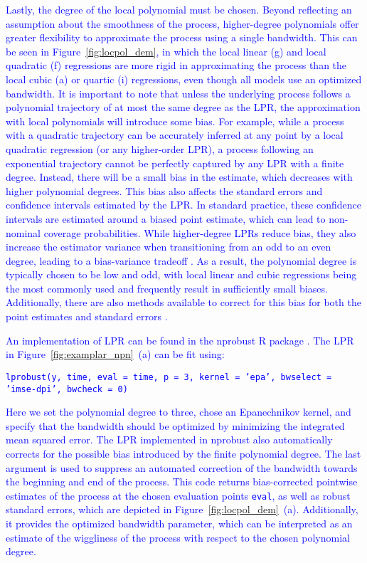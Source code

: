 \documentclass[man, floatsintext]{apa7}
\begin{document}
\textcolor{blue}{
  Lastly, the degree of the local polynomial must be chosen. Beyond reflecting
  an assumption about the smoothness of the process, higher-degree polynomials
  offer greater flexibility to approximate the process using a single
  bandwidth. This can be seen in Figure~\ref{fig:locpol_dem}, in which the
  local linear (g) and local quadratic (f) regressions are more rigid in
  approximating the process than the local cubic (a) or quartic (i)
  regressions, even though all models use an optimized bandwidth. It is
  important to note that unless the underlying process follows a polynomial
  trajectory of at most the same degree as the LPR, the approximation with
  local polynomials will introduce some bias. For example, while a process with
  a quadratic trajectory can be accurately inferred at any point by a local
  quadratic regression (or any higher-order LPR), a process following an
  exponential trajectory cannot be perfectly captured by any LPR with a finite
  degree. Instead, there will be a small bias in the estimate, which decreases
  with higher polynomial degrees. This bias also affects the
  standard errors and confidence intervals estimated by the LPR\@. In standard
  practice, these confidence intervals are estimated around a biased point
  estimate, which can lead to non-nominal coverage probabilities. While
  higher-degree LPRs reduce bias, they also increase the estimator variance
  when transitioning from an odd to an even degree, leading to a bias-variance
  tradeoff \parencite{ruppert_multivariate_1994}. As a result, the polynomial
  degree is typically chosen to be low and odd, with local linear and cubic
  regressions being the most commonly used and frequently result in
  sufficiently small biases. Additionally, there are also methods available
  to correct for this bias for both the point estimates and standard errors
  \parencite{R-nprobust}.
}

\textcolor{blue}{
  An implementation of LPR can be found in the nprobust R package
  \parencite{R-nprobust}. The LPR in Figure~\ref{fig:examplar_npn}~(a) can be
  fit
  using:}

\noindent
\textcolor{blue}{\fontsize{10}{12}\selectfont\texttt{lprobust(y, time, eval =
    time, p = 3, kernel = 'epa', bwselect = 'imse-dpi', bwcheck = 0)}}

\noindent\textcolor{blue}{Here we set the polynomial degree to three, chose an
  Epanechnikov kernel, and specify that the bandwidth should be optimized by
  minimizing the integrated mean squared error. The LPR implemented in nprobust
  also automatically corrects for the possible bias introduced by the finite
  polynomial degree. The last argument is used to suppress an automated
  correction of the bandwidth towards the beginning and end of the process.
  This code returns bias-corrected pointwise estimates of the process at the
  chosen evaluation points {\fontsize{10}{12}\selectfont\texttt{eval}}, as well
  as robust standard errors, which are depicted in
  Figure~\ref{fig:locpol_dem}~(a). Additionally, it provides the optimized
  bandwidth parameter, which can
  be interpreted as an estimate of the wiggliness of the process with respect
  to the chosen polynomial degree.
}
\end{document}
